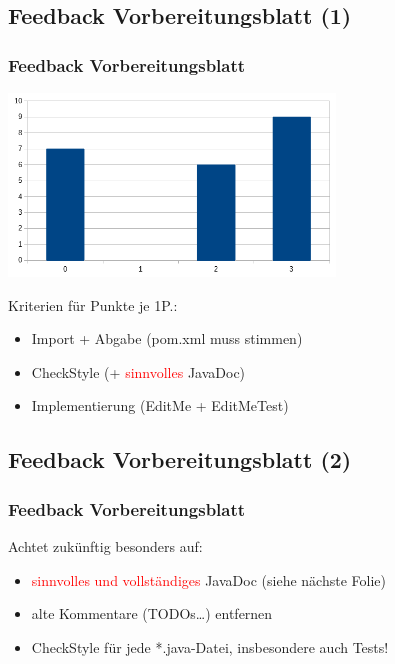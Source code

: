 \documentclass[18pt]{beamer}
\begin{document}
	\subsection{Feedback Vorbereitungsblatt (1)}	
	\begin{frame}
		\frametitle{Feedback Vorbereitungsblatt}
		\centering
		\includegraphics[width=0.65\textwidth, scale=0.8]{pics/tut0/stat_tut0.png}
		\begin{block}{Kriterien für Punkte}
			je 1P.:
			\begin{itemize}
				\item Import + Abgabe (pom.xml muss stimmen)
				\item CheckStyle (+ \textcolor{red}{sinnvolles} JavaDoc)
				\item Implementierung (EditMe + EditMeTest)
			\end{itemize}
		\end{block}
	\end{frame}
	
	\subsection{Feedback Vorbereitungsblatt (2)}
	\begin{frame}
		\frametitle{Feedback Vorbereitungsblatt}
		Achtet zukünftig besonders auf:
		\begin{itemize}
			\item \textcolor{red}{sinnvolles und vollständiges} JavaDoc (siehe nächste Folie) \pause
			\item alte Kommentare (TODOs\dots) entfernen \pause
			\item CheckStyle für jede *.java-Datei, insbesondere auch Tests!
		\end{itemize}
	\end{frame}
	
\end{document}
